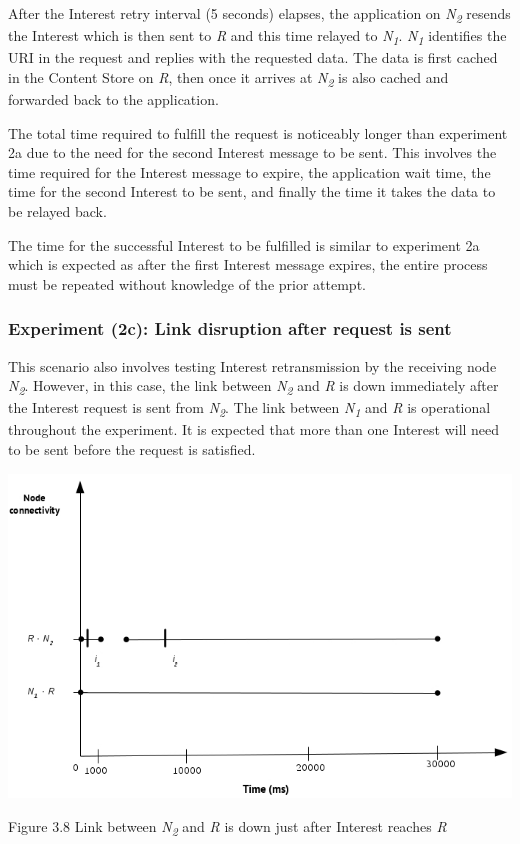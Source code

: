 \documentclass[a4paper,12pt]{report}      %
\begin{document}
After the Interest retry interval (5 seconds) elapses, the application on \emph{N\textsubscript{2}} resends the Interest
which is then sent to \emph{R} and this time relayed to \emph{N\textsubscript{1}}. \emph{N\textsubscript{1}} 
identifies the URI in the request and replies with the requested data. The data is first cached in the 
Content Store on \emph{R}, then once it arrives at \emph{N\textsubscript{2}} is also cached and forwarded back to the application.

The total time required to fulfill the request is noticeably longer than experiment 2a due to the need for
the second Interest message to be sent. This involves the time required for the Interest message to
expire, the application wait time, the time for the second Interest to be sent, and finally the time it takes
the data to be relayed back.

The time for the successful Interest to be fulfilled is similar to experiment 2a which is expected as after
the first Interest message expires, the entire process must be repeated without knowledge of the prior
attempt.

\subsubsection{Experiment (2c): Link disruption after request is sent}

This scenario also involves testing Interest retransmission by the receiving node \emph{N\textsubscript{2}}. However, in
this case, the link between \emph{N\textsubscript{2}} and \emph{R} is down immediately after the Interest request is sent
from \emph{N\textsubscript{2}}. The link between \emph{N\textsubscript{1}} and \emph{R} is operational throughout the experiment. It is expected that more than one Interest will need to be sent before the request is satisfied.

\noindent\includegraphics[scale=0.55]{exp2c_timediag.jpg}\newline
\begin{center}Figure 3.8 Link between \emph{N\textsubscript{2}} and \emph{R} is down just after Interest reaches \emph{R}\end{center}
\end{document}
